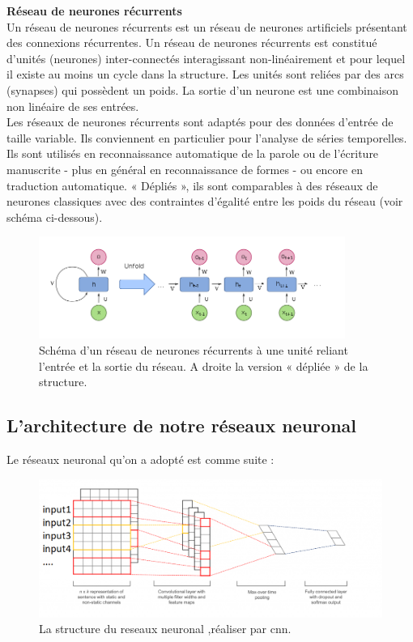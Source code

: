 \textbf{Réseau de neurones récurrents}\\[0.5cm]
 
 Un réseau de neurones récurrents est un réseau de neurones artificiels présentant des connexions récurrentes. Un réseau de neurones récurrents est constitué d'unités (neurones) inter-connectés interagissant non-linéairement et pour lequel il existe au moins un cycle dans la structure. Les unités sont reliées par des arcs (synapses) qui possèdent un poids. La sortie d'un neurone est une combinaison non linéaire de ses entrées.\\[0.2cm]
Les réseaux de neurones récurrents sont adaptés pour des données d'entrée de taille variable. Ils conviennent en particulier pour l'analyse de séries temporelles. Ils sont utilisés en reconnaissance automatique de la parole ou de l'écriture manuscrite - plus en général en reconnaissance de formes - ou encore en traduction automatique. « Dépliés », ils sont comparables à des réseaux de neurones classiques avec des contraintes d'égalité entre les poids du réseau (voir schéma ci-dessous).

\begin{figure}[H]
	\begin{center}
	\includegraphics[width=100mm,scale=0.5]{Images/rnn.png}
	\end{center}
	\caption{Schéma d'un réseau de neurones récurrents à une unité reliant l'entrée et la sortie du réseau. A droite la version « dépliée » de la structure.}
	\label{fig:rnn}
\end{figure}


\subsection{L'architecture de notre réseaux neuronal}
Le réseaux neuronal qu'on a adopté est comme suite : 

\begin{figure}[H]
	\begin{center}
	\includegraphics[width=\linewidth]{Images/cnn.png}
	\end{center}
	\caption{La structure du reseaux neuronal ,réaliser par cnn.}
	\label{fig:cnn1}
\end{figure}


